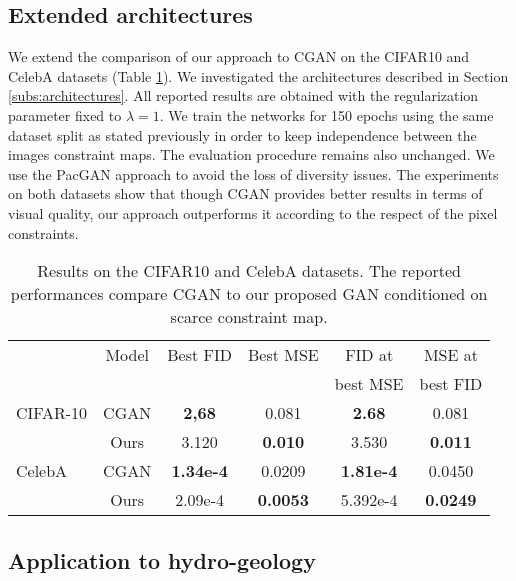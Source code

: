 \subsection{Extended architectures}
We extend the comparison of our approach to CGAN on the CIFAR10 and CelebA  datasets (Table \ref{tab:cifar10}). We investigated the architectures described in Section \ref{subs:architectures}. All reported results are obtained with the regularization parameter fixed to $\lambda=1$.
We train the networks for 150 epochs using the same dataset split as stated previously in order to keep independence between the images constraint maps. The evaluation procedure remains also unchanged. We use the PacGAN approach to avoid the loss of diversity issues. The experiments on both datasets show that though CGAN  provides better results in terms of visual quality, our approach outperforms it according to the respect of the pixel constraints.

\begin{table}[!]
	\centering
	\begin{tabular}{|l|c|c|c|c|c|}
		\hline
		&Model           & Best FID & Best MSE & FID at & MSE at \\
		&&&&best MSE & best FID \\
		\hline
		CIFAR-10 &CGAN   & \textbf{2,68}  & 0.081  & \textbf{2.68}  & 0.081\\
		&Ours            & 3.120 & \textbf{0.010} & 3.530 & \textbf{0.011} \\    
		\hline
		CelebA &CGAN      & \textbf{1.34e-4} & 0.0209 &  \textbf{1.81e-4} & 0.0450\\
		&Ours            & 2.09e-4& \textbf{0.0053} & 5.392e-4 & \textbf{0.0249} \\
		\hline
	\end{tabular}
	
	\caption{Results on the CIFAR10 and CelebA datasets. The reported performances compare CGAN to our proposed GAN conditioned on scarce constraint map.}
	\label{tab:cifar10}
\end{table}


\vspace{0.4cm}

\subsection{Application to hydro-geology}
\label{subs:subsurface}

